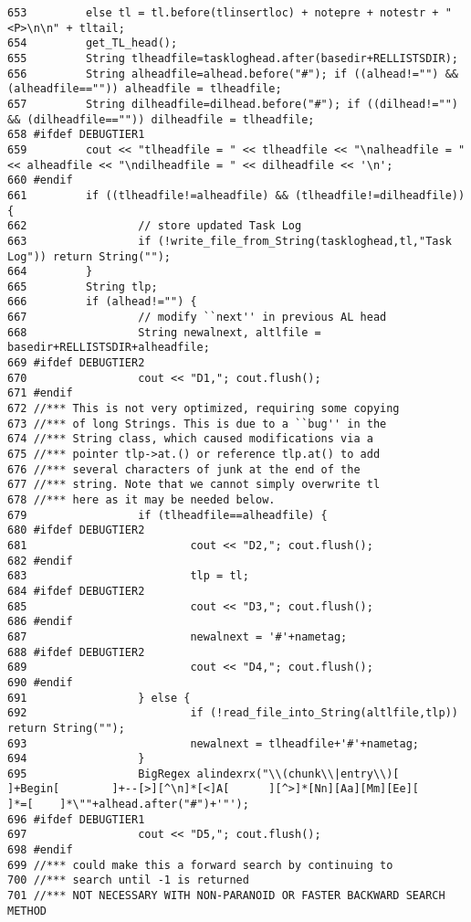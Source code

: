 \begin{verbatim}
653         else tl = tl.before(tlinsertloc) + notepre + notestr + "<P>\n\n" + tltail;
654         get_TL_head();
655         String tlheadfile=taskloghead.after(basedir+RELLISTSDIR);
656         String alheadfile=alhead.before("#"); if ((alhead!="") && (alheadfile=="")) alheadfile = tlheadfile;
657         String dilheadfile=dilhead.before("#"); if ((dilhead!="") && (dilheadfile=="")) dilheadfile = tlheadfile;
658 #ifdef DEBUGTIER1
659         cout << "tlheadfile = " << tlheadfile << "\nalheadfile = " << alheadfile << "\ndilheadfile = " << dilheadfile << '\n';
660 #endif
661         if ((tlheadfile!=alheadfile) && (tlheadfile!=dilheadfile)) {
662                 // store updated Task Log
663                 if (!write_file_from_String(taskloghead,tl,"Task Log")) return String("");
664         }
665         String tlp;
666         if (alhead!="") {
667                 // modify ``next'' in previous AL head
668                 String newalnext, altlfile = basedir+RELLISTSDIR+alheadfile;
669 #ifdef DEBUGTIER2
670                 cout << "D1,"; cout.flush();
671 #endif
672 //*** This is not very optimized, requiring some copying
673 //*** of long Strings. This is due to a ``bug'' in the
674 //*** String class, which caused modifications via a
675 //*** pointer tlp->at.() or reference tlp.at() to add
676 //*** several characters of junk at the end of the
677 //*** string. Note that we cannot simply overwrite tl
678 //*** here as it may be needed below.
679                 if (tlheadfile==alheadfile) {
680 #ifdef DEBUGTIER2
681                         cout << "D2,"; cout.flush();
682 #endif
683                         tlp = tl;
684 #ifdef DEBUGTIER2
685                         cout << "D3,"; cout.flush();
686 #endif
687                         newalnext = '#'+nametag;
688 #ifdef DEBUGTIER2
689                         cout << "D4,"; cout.flush();
690 #endif
691                 } else {
692                         if (!read_file_into_String(altlfile,tlp)) return String("");
693                         newalnext = tlheadfile+'#'+nametag;
694                 }
695                 BigRegex alindexrx("\\(chunk\\|entry\\)[        ]+Begin[        ]+--[>][^\n]*[<]A[      ][^>]*[Nn][Aa][Mm][Ee][         ]*=[    ]*\""+alhead.after("#")+'"');
696 #ifdef DEBUGTIER1
697                 cout << "D5,"; cout.flush();
698 #endif
699 //*** could make this a forward search by continuing to
700 //*** search until -1 is returned
701 //*** NOT NECESSARY WITH NON-PARANOID OR FASTER BACKWARD SEARCH METHOD

\end{verbatim}

